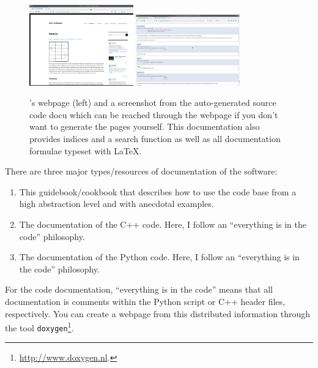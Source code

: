 \begin{figure}
 \begin{center}
  \includegraphics[width=0.4\textwidth]{10_installation/webpage.png}
  \hspace{0.4cm}
  \includegraphics[width=0.4\textwidth]{10_installation/source-docu.png}
 \end{center}
 \caption{
  \Peano's webpage (left) and a screenshot from the auto-generated source code
  docu which can be reached through the webpage if you don't want to generate
  the pages yourself.
  This documentation also provides indices and a search function as well as all
  documentation formulae typeset with LaTeX.
 }
\end{figure}



There are three major types/resources of documentation of the software:
\begin{enumerate}
  \item This guidebook/cookbook that describes how to use the code base from a
  high abstraction level and with anecdotal examples.
  \item The documentation of the C++ code. Here, I follow an ``everything is in
  the code'' philosophy.
  \item The documentation of the Python code. Here, I follow an ``everything is
  in the code'' philosophy.
\end{enumerate}

\noindent
For the code documentation, ``everything is in the code'' means that all
documentation is comments within the Python script or C++ header files,
respectively.
You can create a webpage from this distributed information through
the tool \texttt{doxygen}\footnote{\url{http://www.doxygen.nl}.}. 


